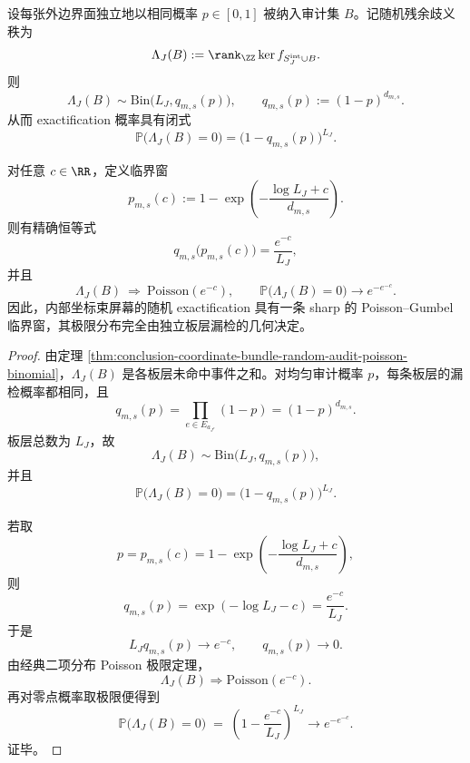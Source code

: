 \begin{theorem}\label{thm:conclusion-coordinatebundle-poisson-gumbel-critical-window}
设每张外边界面独立地以相同概率 \(p\in[0,1]\) 被纳入审计集 \(B\)。记随机残余歧义秩为
\[
\Lambda_J(B):=\rank_{\ZZ}\ker f_{S_J^{\mathrm{int}}\cup B}.
\]
则
\[
\Lambda_J(B)\sim \mathrm{Bin}\!\bigl(L_J,q_{m,s}(p)\bigr),
\qquad
q_{m,s}(p):=(1-p)^{d_{m,s}}.
\]
从而 exactification 概率具有闭式
\[
\mathbb P\bigl(\Lambda_J(B)=0\bigr)=\bigl(1-q_{m,s}(p)\bigr)^{L_J}.
\]

对任意 \(c\in\RR\)，定义临界窗
\[
p_{m,s}(c):=1-\exp\!\left(-\frac{\log L_J+c}{d_{m,s}}\right).
\]
则有精确恒等式
\[
q_{m,s}\bigl(p_{m,s}(c)\bigr)=\frac{e^{-c}}{L_J},
\]
并且
\[
\Lambda_J(B)\ \Longrightarrow\ \mathrm{Poisson}(e^{-c}),
\qquad
\mathbb P\bigl(\Lambda_J(B)=0\bigr)\longrightarrow e^{-e^{-c}}.
\]
因此，内部坐标束屏幕的随机 exactification 具有一条 sharp 的 Poisson--Gumbel 临界窗，其极限分布完全由独立板层漏检的几何决定。
\end{theorem}
\begin{proof}
由定理 \ref{thm:conclusion-coordinate-bundle-random-audit-poisson-binomial}，\(\Lambda_J(B)\) 是各板层未命中事件之和。对均匀审计概率 \(p\)，每条板层的漏检概率都相同，且
\[
q_{m,s}(p)=\prod_{e\in E_{a_{J^c}}}(1-p)=(1-p)^{d_{m,s}}.
\]
板层总数为 \(L_J\)，故
\[
\Lambda_J(B)\sim \mathrm{Bin}\!\bigl(L_J,q_{m,s}(p)\bigr),
\]
并且
\[
\mathbb P\bigl(\Lambda_J(B)=0\bigr)=\bigl(1-q_{m,s}(p)\bigr)^{L_J}.
\]

若取
\[
p=p_{m,s}(c)=1-\exp\!\left(-\frac{\log L_J+c}{d_{m,s}}\right),
\]
则
\[
q_{m,s}(p)=\exp(-\log L_J-c)=\frac{e^{-c}}{L_J}.
\]
于是
\[
L_J q_{m,s}(p)\to e^{-c},
\qquad
q_{m,s}(p)\to 0.
\]
由经典二项分布 Poisson 极限定理，
\[
\Lambda_J(B)\Rightarrow \mathrm{Poisson}(e^{-c}).
\]
再对零点概率取极限便得到
\[
\mathbb P\bigl(\Lambda_J(B)=0\bigr)
\;=\;
\left(1-\frac{e^{-c}}{L_J}\right)^{L_J}
\longrightarrow
e^{-e^{-c}}.
\]
证毕。
\end{proof}

